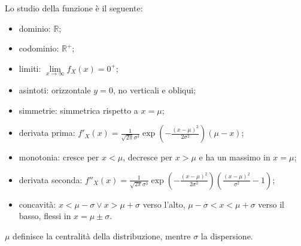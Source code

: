 Lo studio della funzione è il seguente:
\begin{itemize}
    \item dominio: $\mathbb R$;
    \item codominio: $\mathbb R^+$;
    \item limiti: $\lim\limits_{x \to \infty} f_X(x) = 0^+$;
    \item asintoti: orizzontale $y = 0$, no verticali e obliqui;
    \item simmetrie: simmetrica rispetto a $x = \mu$;
    \item derivata prima: $\displaystyle f'_X(x) = \frac{1}{\sqrt{2 \pi} \sigma^3} \exp{\!\left(-\frac{(x-\mu)^2}{2\sigma^2} \right)} (\mu - x)$;
    \item monotonia: cresce per $x < \mu$, decresce per $x > \mu$ e ha un massimo in $x = \mu$;
    \item derivata seconda: $\displaystyle f''_X(x) = \frac{1}{\sqrt{2 \pi} \sigma^3} \exp{\!\left(-\frac{(x-\mu)^2}{2\sigma^2} \right)} \left ( \frac{(x - \mu)^2}{\sigma^2} - 1 \right )$;
    \item concavità: $x < \mu - \sigma \lor x > \mu + \sigma$ verso l'alto, $\mu - \sigma < x < \mu + \sigma$ verso il basso, flessi in $x = \mu \pm \sigma$.
\end{itemize}
$\mu$ definisce la centralità della distribuzione, mentre $\sigma$ la dispersione. \\ 

